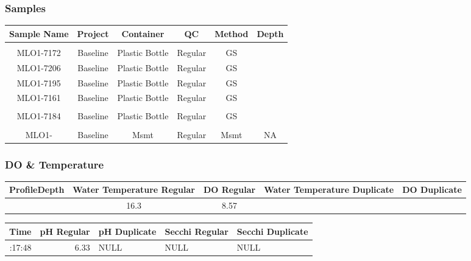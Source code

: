 \documentclass[
  letterpaper,
  DIV=11,
  numbers=noendperiod]{scrartcl}
\begin{document}
\subsubsection{Samples}

\begin{longtable*}{cccccc}
\toprule
Sample Name & Project & Container & QC & Method & Depth \\ 
\midrule\addlinespace[2.5pt]
 \\ 
\midrule\addlinespace[2.5pt]
MLO1-7172 & Baseline & Plastic Bottle & Regular & GS &  \\ 
MLO1-7206 & Baseline & Plastic Bottle & Regular & GS &  \\ 
MLO1-7195 & Baseline & Plastic Bottle & Regular & GS &  \\ 
MLO1-7161 & Baseline & Plastic Bottle & Regular & GS &  \\ 
\midrule\addlinespace[2.5pt]
 \\ 
\midrule\addlinespace[2.5pt]
MLO1-7184 & Baseline & Plastic Bottle & Regular & GS &  \\ 
\midrule\addlinespace[2.5pt]
 \\ 
\midrule\addlinespace[2.5pt]
MLO1- & Baseline & Msmt & Regular & Msmt & NA \\ 
\bottomrule
\end{longtable*}

\subsubsection{DO \& Temperature}

\begin{longtable*}{rcccc}
\toprule
ProfileDepth & Water Temperature Regular & DO Regular & Water Temperature Duplicate & DO Duplicate \\ 
\midrule{} & 16.3 & 8.57 &  &  \\ 
\bottomrule
\end{longtable*}

\begin{longtable*}{rrlll}
\toprule
Time & pH Regular & pH Duplicate & Secchi Regular & Secchi Duplicate \\ 
\midrule{}:17:48 & 6.33 & NULL & NULL & NULL \\ 
\bottomrule
\end{longtable*}
\end{document}
